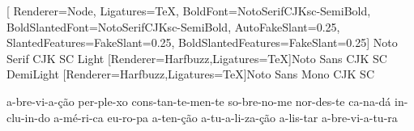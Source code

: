 %
%


\setlength\parindent{0pt}
\setlength\parindent{0pt}

\setlrmarginsandblock{3cm}{2cm}{*}
\checkandfixthelayout

\raggedbottom

\OnehalfSpacing

[
 Renderer=Node,
 Ligatures=TeX,
 BoldFont={NotoSerifCJKsc-SemiBold},
 BoldSlantedFont={NotoSerifCJKsc-SemiBold},
 AutoFakeSlant=0.25,
 SlantedFeatures={FakeSlant=0.25},
 BoldSlantedFeatures={FakeSlant=0.25}]
 {Noto Serif CJK SC Light}
[Renderer=Harfbuzz,Ligatures=TeX]{Noto Sans CJK SC DemiLight}
[Renderer=Harfbuzz,Ligatures=TeX]{Noto Sans Mono CJK SC}

\babelhyphenation
 {%
  a-bre-vi-a-ção per-ple-xo cons-tan-te-men-te so-bre-no-me nor-des-te
  ca-na-dá in-clu-in-do a-mé-ri-ca eu-ro-pa a-ten-ção a-tu-a-li-za-ção
  a-lis-tar a-bre-vi-a-tu-ra
 }    

\makeatletter
\renewcommand{\@pnumwidth}{2em} 
\renewcommand{\@tocrmarg}{4em}
\makeatother
\renewcommand\cftbeforechapterskip{5pt plus 1pt}

\setlength{\columnsep}{.8em}
\setlength{\columnseprule}{0.1mm}

\setheadfoot{14pt}{28pt}

\newcommand{\boxedsec}[1]
 {%
  \begin{tcolorbox}%
   [%
    before skip=3sp plus 1sp minus 1sp,
    after skip=2sp plus 1sp minus 1sp,
    colframe=black,%
    colback=black!5!white,%
    boxrule=2pt,%
    leftrule=2mm,%
    left=0mm,%
    right=0mm,%
    top=0mm,%
    bottom=0mm%
   ]
   \LARGE\bfseries#1
  \end{tcolorbox}
 }
\setsecheadstyle{\boxedsec}
\newcommand{\sectionbreak}{\phantomsection}

